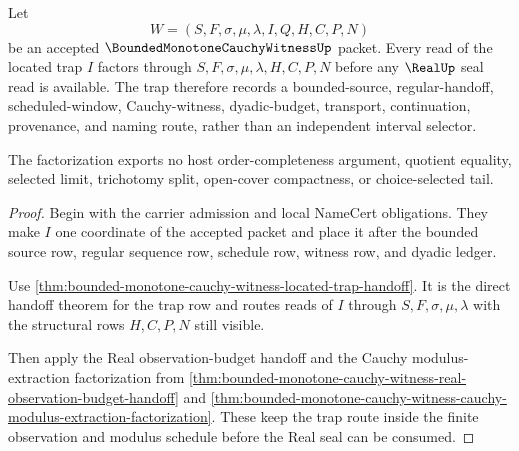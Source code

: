 \begin{theorem}
\label{thm:bounded-monotone-cauchy-witness-located-trap-factorization}
Let
$$
W=(S,F,\sigma,\mu,\lambda,I,Q,H,C,P,N)
$$
be an accepted $\BoundedMonotoneCauchyWitnessUp$ packet. Every read of the located trap $I$ factors through $S,F,\sigma,\mu,\lambda,H,C,P,N$ before any $\RealUp$ seal read is available. The trap therefore records a bounded-source, regular-handoff, scheduled-window, Cauchy-witness, dyadic-budget, transport, continuation, provenance, and naming route, rather than an independent interval selector.

The factorization exports no host order-completeness argument, quotient equality, selected limit, trichotomy split, open-cover compactness, or choice-selected tail.
\end{theorem}
\begin{proof}
Begin with the carrier admission and local NameCert obligations. They make $I$ one coordinate of the accepted packet and place it after the bounded source row, regular sequence row, schedule row, witness row, and dyadic ledger.

Use \autoref{thm:bounded-monotone-cauchy-witness-located-trap-handoff}. It is the direct handoff theorem for the trap row and routes reads of $I$ through $S,F,\sigma,\mu,\lambda$ with the structural rows $H,C,P,N$ still visible.

Then apply the Real observation-budget handoff and the Cauchy modulus-extraction factorization from \autoref{thm:bounded-monotone-cauchy-witness-real-observation-budget-handoff} and \autoref{thm:bounded-monotone-cauchy-witness-cauchy-modulus-extraction-factorization}. These keep the trap route inside the finite observation and modulus schedule before the Real seal can be consumed.
\end{proof}

